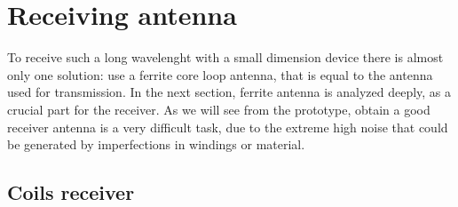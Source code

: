 \section{Receiving antenna}

To receive such a long wavelenght with a small dimension device there is almost only one solution: use a ferrite core loop antenna, that is equal to the antenna used for transmission. In the next section, ferrite antenna is analyzed deeply, as a crucial part for the receiver. As we will see from the prototype, obtain a good receiver antenna is a very difficult task, due to the extreme high noise that could be generated by imperfections in windings or material.

\subsection{Coils receiver}

